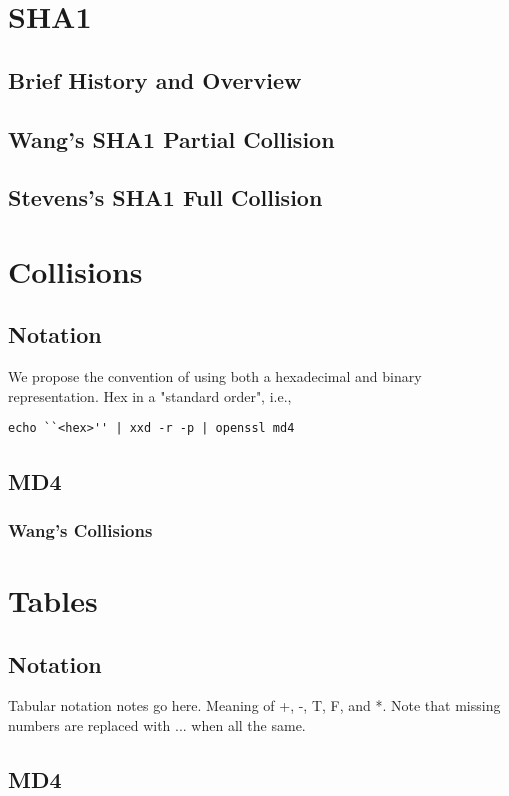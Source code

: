 \documentclass[letterpaper,twocolumn,10pt]{article}
\begin{document}
\section{SHA1}
\subsection{Brief History and Overview}
\subsection{Wang's SHA1 Partial Collision}
\subsection{Stevens's SHA1 Full Collision}

\newpage
\section{Collisions}
\subsection{Notation}
We propose the convention of using both a hexadecimal and binary representation.
Hex in a "standard order", i.e.,
\begin{lstlisting}
echo ``<hex>'' | xxd -r -p | openssl md4
\end{lstlisting}

\subsection{MD4}
\subsubsection{Wang's Collisions}

\newpage
\section{Tables}
\subsection{Notation}
Tabular notation notes go here.
Meaning of +, -, T, F, and *.
Note that missing numbers are replaced
with ... when all the same.

\subsection{MD4}
\end{document}
